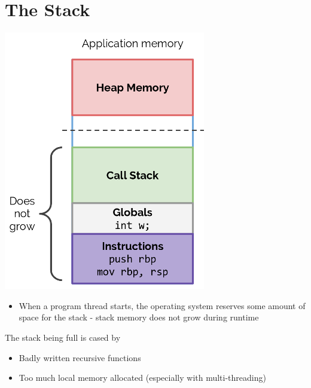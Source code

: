 \documentclass{article}[18pt]
\begin{document}
\section{The Stack}
\begin{center}
	\includegraphics[scale=0.4]{stack}
\end{center}
\begin{itemize}
	\item When a program thread starts, the operating system reserves some amount of space for the stack - stack memory does not grow during runtime
\end{itemize}
The stack being full is cased by
\begin{itemize}
	\item Badly written recursive functions
	\item Too much local memory allocated (especially with multi-threading)
\end{itemize}
\end{document}
